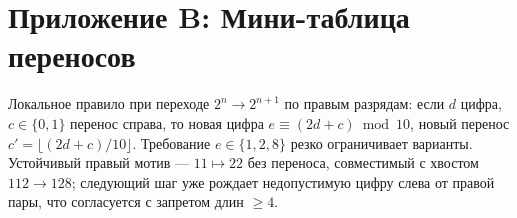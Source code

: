 \documentclass[12pt]{article}
\theoremstyle{plain}
\theoremstyle{remark}
\begin{document}
\section*{Приложение B: Мини-таблица переносов}
Локальное правило при переходе $2^n\to2^{n+1}$ по правым разрядам: если $d$ цифра, $c\in\{0,1\}$ перенос справа, то новая цифра $e\equiv (2d+c)\bmod10$, новый перенос $c'=\lfloor (2d+c)/10\rfloor$. Требование $e\in\{1,2,8\}$ резко ограничивает варианты. Устойчивый правый мотив — $11\mapsto 22$ без переноса, совместимый с хвостом $112\to128$; следующий шаг уже рождает недопустимую цифру слева от правой пары, что согласуется с запретом длин $\ge4$.
\end{document}
